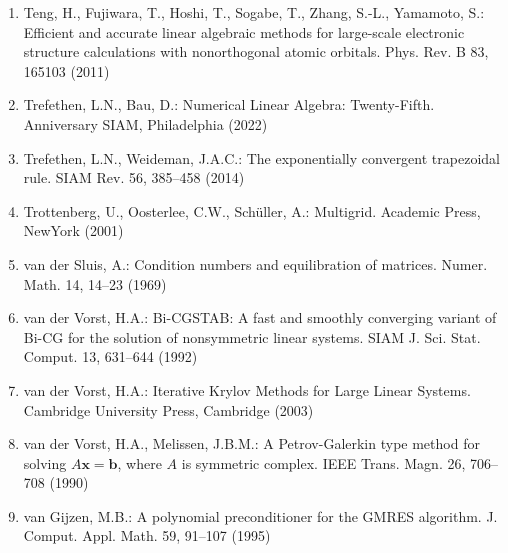 \begin{enumerate}[label=\arabic*.,ref=\arabic*,leftmargin=3em]
\item\label{bib:source-190}Teng, H., Fujiwara, T., Hoshi, T., Sogabe, T., Zhang, S.-L., Yamamoto, S.: Efficient and accurate linear algebraic methods for large-scale electronic structure calculations with nonorthogonal atomic orbitals. Phys. Rev. B 83, 165103 (2011)

\item\label{bib:source-191}Trefethen, L.N., Bau, D.: Numerical Linear Algebra: Twenty-Fifth. Anniversary SIAM, Philadelphia (2022)

\item\label{bib:source-192}Trefethen, L.N., Weideman, J.A.C.: The exponentially convergent trapezoidal rule. SIAM Rev. 56, 385–458 (2014)

\item\label{bib:source-193}Trottenberg, U., Oosterlee, C.W., Schüller, A.: Multigrid. Academic Press, NewYork (2001)

\item\label{bib:source-194}van der Sluis, A.: Condition numbers and equilibration of matrices. Numer. Math. 14, 14–23 (1969)

\item\label{bib:source-195}van der Vorst, H.A.: Bi-CGSTAB: A fast and smoothly converging variant of Bi-CG for the solution of nonsymmetric linear systems. SIAM J. Sci. Stat. Comput. 13, 631–644 (1992)

\item\label{bib:source-196}van der Vorst, H.A.: Iterative Krylov Methods for Large Linear Systems. Cambridge University Press, Cambridge (2003)

\item\label{bib:source-197}van der Vorst, H.A., Melissen, J.B.M.: A Petrov-Galerkin type method for solving $A\boldsymbol{x}=\boldsymbol{b}$, where $A$ is symmetric complex. IEEE Trans. Magn. 26, 706–708 (1990)

\item\label{bib:source-198}van Gijzen, M.B.: A polynomial preconditioner for the GMRES algorithm. J. Comput. Appl. Math. 59, 91–107 (1995)


\end{enumerate}
